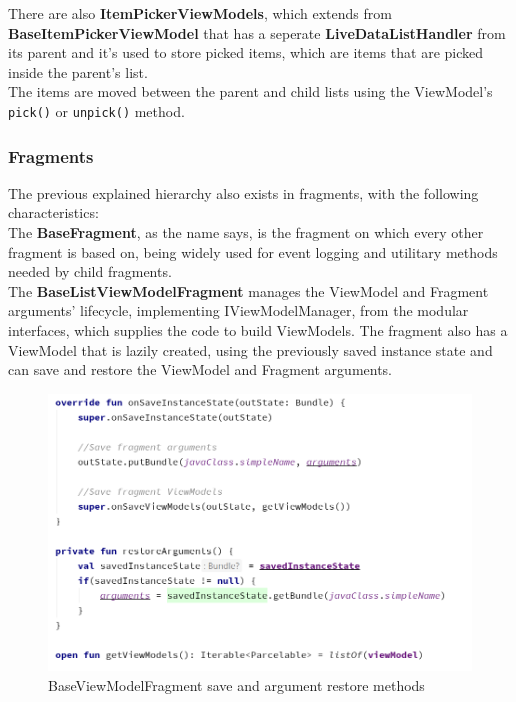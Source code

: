 There are also \textbf{ItemPickerViewModels}, which extends from \textbf{BaseItemPickerViewModel} that has a seperate \textbf{LiveDataListHandler} from its parent and
it's used to store picked items, which are items that are picked inside the parent's list.\\

The items are moved between the parent and child lists using the ViewModel's \texttt{pick()} or \texttt{unpick()} method.\\

\subsubsection{Fragments}

The previous explained hierarchy also exists in fragments, with the following characteristics:\\

The \textbf{BaseFragment}, as the name says, is the fragment on which every other fragment is based on, being widely used for event 
logging and utilitary methods needed by child fragments.\\

The \textbf{BaseListViewModelFragment} manages the ViewModel and Fragment arguments' lifecycle, implementing IViewModelManager,
from the modular interfaces, which supplies the code to build ViewModels. 
The fragment also has a ViewModel that is lazily created, using the previously saved instance state and can save and restore 
the ViewModel and Fragment arguments.\\

\begin{figure}[H]
    \begin{center}
        \includegraphics[scale=0.5]{_figures/BaseViewModelFragment(save and restore).png}
        \caption{BaseViewModelFragment save and argument restore methods}
    \end{center}
\end{figure}

